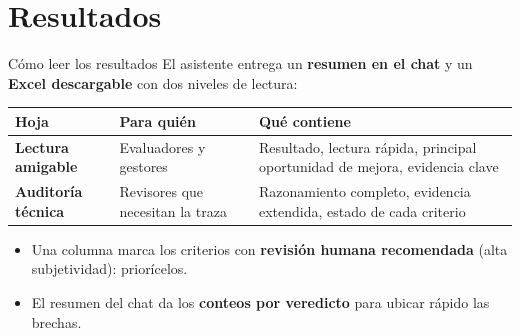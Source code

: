 \documentclass[aspectratio=169,11pt]{beamer}
\newcommand{\redlead}[1]{\textbf{\color{iloRed}#1}}
\newcommand{\bluelead}[1]{\textbf{\color{iloBlue}#1}}
\begin{document}
\section{Resultados}
\begin{frame}{Cómo leer los resultados}
  \small
  El asistente entrega un \bluelead{resumen en el chat} y un \bluelead{Excel descargable} con dos niveles de lectura:
  \vspace{0.2cm}
  \renewcommand{\arraystretch}{1.35}
  \begin{tabular}{@{}p{3.4cm}p{4.0cm}p{4.3cm}@{}}
    \toprule
    \rowcolor{iloBlue}\color{white}\textbf{Hoja} & \color{white}\textbf{Para quién} & \color{white}\textbf{Qué contiene}\\
    \midrule
    \bluelead{Lectura amigable} & Evaluadores y gestores & Resultado, lectura rápida, principal oportunidad de mejora, evidencia clave\\
    \rowcolor{iloGrayLt}\bluelead{Auditoría técnica} & Revisores que necesitan la traza & Razonamiento completo, evidencia extendida, estado de cada criterio\\
    \bottomrule
  \end{tabular}
  \vspace{0.25cm}
  \begin{itemize}
    \item[\textcolor{iloRed}{\textbullet}] Una columna marca los criterios con \redlead{revisión humana recomendada} (alta subjetividad): priorícelos.
    \item[\textcolor{iloRed}{\textbullet}] El resumen del chat da los \bluelead{conteos por veredicto} para ubicar rápido las brechas.
  \end{itemize}
\end{frame}
\end{document}
